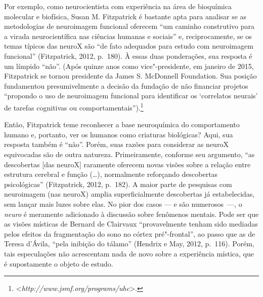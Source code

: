 Por exemplo, como neurocientista com experiência na área de
bioquímica molecular e biofísica, Susan M. Fitzpatrick é bastante apta
para analisar se as metodologias de neuroimagem funcional oferecem ``um
caminho construtivo para a virada neurocientífica nas ciências humanas e
sociais'' e, reciprocamente, se os temas típicos das neuroX são ``de
fato adequados para estudo com neuroimagem funcional'' (Fitzpatrick,
2012, p.~180). À essas duas ponderações, sua resposta é um límpido
``não''. (Após quinze anos como vice"-presidente, em janeiro de 2015,
Fitzpatrick se tornou presidente da James S. McDonnell Foundation. Sua
posição fundamentou presumivelmente a decisão da fundação de não
financiar projetos ``propondo o uso de neuroimagem funcional para
identificar os `correlatos neurais' de tarefas cognitivas ou
comportamentais'').\footnote[6]{\textless{}\emph{http://www.jsmf.org/programs/uhc}\textgreater{}.}

Então, Fitzpatrick teme reconhecer a base neuroquímica do comportamento
humano e, portanto, ver os humanos como criaturas biológicas? Aqui, sua
resposta também é ``não''. Porém, suas razões para considerar as neuroX
equivocadas são de outra natureza. Primeiramente, conforme seu
argumento, ``as descobertas {[}das neuroX{]} raramente oferecem novas visões sobre a
relação entre estrutura cerebral e função (\ldots{}), normalmente reforçando
descobertas psicológicas'' (Fitzpatrick, 2012, p.~182). A maior parte de
pesquisas com neuroimagem (nas neuroX) amplia superficialmente
descobertas já estabelecidas, sem lançar mais luzes sobre elas. No pior
dos casos --- e são numerosos~---, o \emph{neuro} é meramente adicionado
à discussão sobre fenômenos mentais. Pode ser que as visões místicas de
Bernard de Clairvaux ``provavelmente tenham sido mediadas pelos efeitos
da fragmentação do sono no córtex pré"-frontal'', ao passo que as de
Teresa d'Ávila, ``pela inibição do tálamo'' (Hendrix e May, 2012,
p.~116). Porém, tais especulações não acrescentam nada de novo sobre a
experiência mística, que é supostamente o objeto de estudo.

